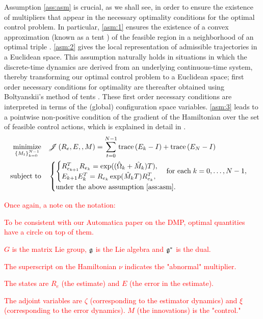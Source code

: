 \documentclass[12pt]{article}
\begin{document}
   Assumption \ref{ass:asm} is crucial, as we shall see, in order to ensure the existence of multipliers that appear in the necessary optimality conditions for the optimal control problem. In particular, \ref{asm:1} ensures the existence of a convex approximation (known as a tent \cite{tent}) of the feasible region in a neighborhood of an optimal triple . \ref{asm:2} gives the local representation of admissible trajectories  in a Euclidean space. This assumption naturally holds in situations in which the discrete-time dynamics are derived from an underlying continuous-time system, thereby transforming our optimal control problem to a Euclidean space; first order necessary conditions for optimality are thereafter obtained using Boltyanskii's method of tents \cite{tent}. These first order necessary conditions are interpreted in terms of the (global) configuration space variables.  \ref{asm:3} leads to a pointwise non-positive condition of the gradient of the Hamiltonian over the set of feasible control actions, which is explained in detail in .
%
\begin{equation}
\label{eq:sopt}
\begin{aligned}
\operatorname*{minimize}_{\left\{M_t\right\}_{k=0}^{N-1}} &&& \mathscr{J} \left(R_e,E,,M\right) = \sum_{t=0}^{N-1} 
\mathop{\hbox{trace}} \left(E_k - I \right) + \mathop{\hbox{trace}} \left(E_N - I \right) \\
\text{subject to} &&&
\begin{cases}
\begin{cases} R_{e_{k+1}}^T R_{e_{k}} =  \exp( (\hat{\Omega}_k +  \hat{M}_k) T)  ,\\
E_{k+1} E_{k}^T = R_{e_{k}}  \exp(\hat{M}_k T) R_{e_{k}}^T , \\
 \end{cases} 
 \text{for each\;} k =0,\ldots,N-1, \\
 \text{under the above assumption \ref{ass:asm}.}
 \end{cases} 
\end{aligned} 
\end{equation}
%
%
\textcolor{red}{Once again, a note on the notation: 
\bei
%
\item To be consistent with our Automatica paper on the DMP, optimal quantities have a circle on top of them.
%
\item $G$ is the matrix Lie group, $\mathfrak{g}$ is the Lie algebra and $\mathfrak{g}^*$ is the dual.
%
\item The superscript on the Hamiltonian $\nu$ indicates the "abnormal" multiplier.
%
\item The states are $R_e$ (the estimate) and $E$ (the error in the estimate).
%
\item The adjoint variables are $\zeta$ (corresponding to the estimator dynamics) and $\xi$ 
(corresponding to the error dynamics).
%
\iten $M$ (the innovations) is the "control."
%
\ei
%
}
\end{document}

